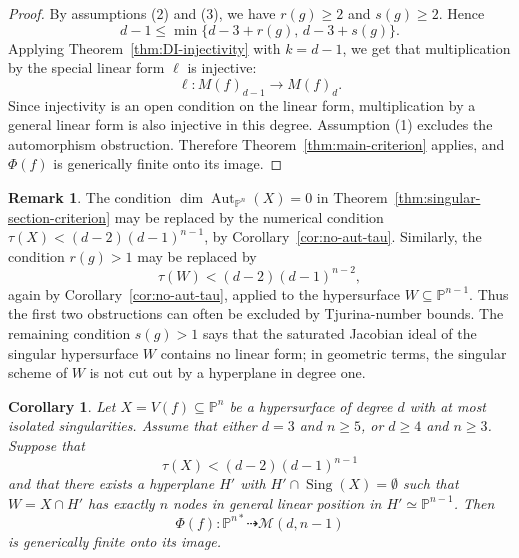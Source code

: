 \documentclass[11pt]{amsart}
\theoremstyle{plain}
\newtheorem{cor}[subsection]{Corollary}
\theoremstyle{definition}
\newtheorem{rk}[subsection]{Remark}
\numberwithin{equation}{section}
\newcommand{\M}{{\mathcal M}}
\newcommand{\PP}{\mathbb{P}}
\DeclareMathOperator{\Aut}{Aut}
\DeclareMathOperator{\Sing}{Sing}
\begin{document}
\begin{proof}
By assumptions (2) and (3), we have $r(g)\geq2$ and $s(g)\geq2$. Hence
\[
d-1\leq \min\{d-3+r(g),\,d-3+s(g)\}.
\]
Applying Theorem~\ref{thm:DI-injectivity} with $k=d-1$, we get that
multiplication by the special linear form $\ell$ is injective:
\[
\ell:M(f)_{d-1}\to M(f)_d.
\]
Since injectivity is an open condition on the linear form, multiplication by a
general linear form is also injective in this degree. Assumption (1) excludes the
automorphism obstruction. Therefore Theorem~\ref{thm:main-criterion} applies,
and $\Phi(f)$ is generically finite onto its image.
\end{proof}

\begin{rk}
\label{rk:singular-section-numerical}
The condition $\dim\Aut_{\PP^n}(X)=0$ in Theorem~\ref{thm:singular-section-criterion}
may be replaced by the numerical condition
$\tau(X)<(d-2)(d-1)^{n-1}$, by Corollary~\ref{cor:no-aut-tau}. Similarly, the
condition $r(g)>1$ may be replaced by
\[
\tau(W)<(d-2)(d-1)^{n-2},
\]
again by Corollary~\ref{cor:no-aut-tau}, applied to the hypersurface
$W\subseteq\PP^{n-1}$. Thus the first two obstructions can often be excluded by
Tjurina-number bounds. The remaining condition $s(g)>1$ says that the saturated
Jacobian ideal of the singular hypersurface $W$ contains no linear form; in
geometric terms, the singular scheme of $W$ is not cut out by a hyperplane in
degree one.
\end{rk}

\begin{cor}
\label{cor:nodal-section-criterion}
Let $X=V(f)\subseteq\PP^n$ be a hypersurface of degree $d$ with at most isolated
singularities. Assume that either $d=3$ and $n\geq5$, or $d\geq4$ and
$n\geq3$. Suppose that
\[
\tau(X)<(d-2)(d-1)^{n-1}
\]
and that there exists a hyperplane $H'$ with $H'\cap\Sing(X)=\emptyset$ such
that $W=X\cap H'$ has exactly $n$ nodes in general linear position in
$H'\simeq\PP^{n-1}$. Then
\[
\Phi(f):\PP^{n*}\dashrightarrow \M(d,n-1)
\]
is generically finite onto its image.
\end{cor}
\end{document}
